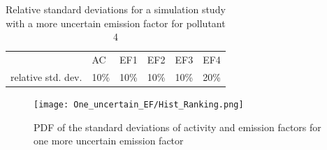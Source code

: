 \documentclass{article}
\begin{document}
\begin{table}[h]
\begin{tabular}{llllll}
& AC   & EF1  & EF2  & EF3  & EF4  \\
relative std. dev. & 10\% & 10\% & 10\% & 10\% & 20\%
\end{tabular}
\caption[Relative standard deviations for a simulation study with a more uncertain emission factor for pollutant 4]{Relative standard deviations for a simulation study with a more uncertain emission factor for pollutant 4} 
\label{tab:one_uncertain_EF}
\end{table}



\begin{figure}[h]
    \texttt{[image: One\_uncertain\_EF/Hist\_Ranking.png]}
    \caption{PDF of the standard deviations of activity and emission factors for one more uncertain emission factor}
    \label{fig:One_uncertain_EF}
\end{figure}
\end{document}
